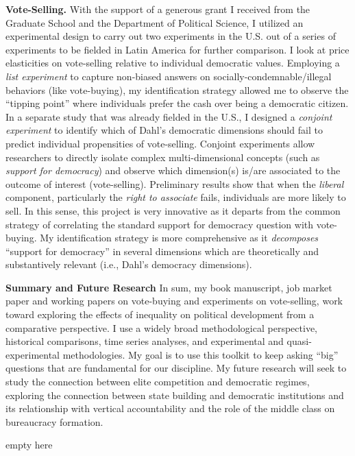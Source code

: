 \documentclass[11pt]{letter} %
\begin{document}
\begin{letter}{}
{\bf Vote-Selling.} With the support of a generous grant I received from the Graduate School and the Department of Political Science, I utilized an experimental design to carry out two experiments in the U.S. out of a series of experiments to be fielded in Latin America for further comparison. I look at price elasticities on vote-selling relative to individual democratic values. Employing a \emph{list experiment} to capture non-biased answers on socially-condemnable/illegal behaviors (like vote-buying), my identification strategy allowed me to observe the ``tipping point'' where individuals prefer the cash over being a democratic citizen. In a separate study that was already fielded in the U.S., I designed a \emph{conjoint experiment} to identify which of Dahl's democratic dimensions should fail to predict individual propensities of vote-selling. Conjoint experiments allow researchers to directly isolate complex multi-dimensional concepts (such as \emph{support for democracy}) and observe which dimension(s) is/are associated to the outcome of interest (vote-selling). Preliminary results show that when the \emph{liberal} component, particularly the \emph{right to associate} fails, individuals are more likely to sell. In this sense, this project is very innovative as it departs from the common strategy of correlating the standard support for democracy question with vote-buying. My identification strategy is more comprehensive as it \emph{decomposes} ``support for democracy'' in several dimensions which are theoretically and substantively relevant (i.e., Dahl's democracy dimensions). 


{\bf Summary and Future Research} In sum, my book manuscript, job market paper and working papers on vote-buying and experiments on vote-selling, work toward exploring the effects of inequality on political development from a comparative perspective. I use a widely broad methodological perspective, historical comparisons, time series analyses, and experimental and quasi-experimental methodologies. My goal is to use this toolkit to keep asking ``big'' questions that are fundamental for our discipline. My future research will seek to study the connection between elite competition and democratic regimes, exploring the connection between state building and democratic institutions and its relationship with vertical accountability and the role of the middle class on bureaucracy formation.

\closing{{\color{white}empty here}}




\end{letter}
\end{document}
